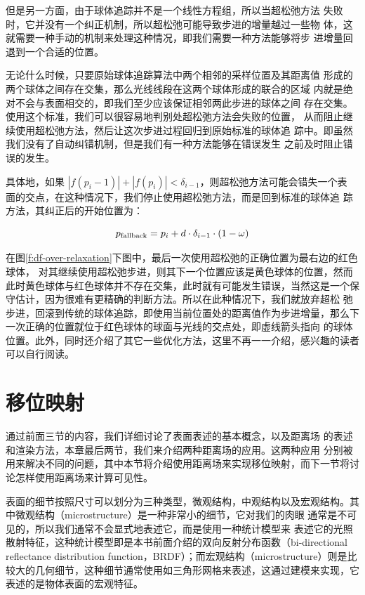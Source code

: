 但是另一方面，由于球体追踪并不是一个线性方程组，所以当超松弛方法 失败时，它并没有一个纠正机制，所以超松弛可能导致步进的增量越过一些物 体，这就需要一种手动的机制来处理这种情况，即我们需要一种方法能够将步 进增量回退到一个合适的位置。

无论什么时候，只要原始球体追踪算法中两个相邻的采样位置及其距离值 形成的两个球体之间存在交集，那么光线线段在这两个球体形成的联合的区域 内就是绝对不会与表面相交的，即我们至少应该保证相邻两此步进的球体之间 存在交集。使用这个标准，我们可以很容易地判别处超松弛方法会失败的位置， 从而阻止继续使用超松弛方法，然后让这次步进过程回归到原始标准的球体追 踪中。即虽然我们没有了自动纠错机制，但是我们有一种方法能够在错误发生 之前及时阻止错误的发生。

具体地，如果 $|f(p_i−1)| + |f(p_i)|< \delta_{i−1}$，则超松弛方法可能会错失一个表 面的交点，在这种情况下，我们停止使用超松弛方法，而是回到标准的球体追 踪方法，其纠正后的开始位置为：

\begin{equation}
	p_{\rm fallback}=p_i+d\cdot \delta_{i-1}\cdot (1-\omega)
\end{equation}

在图\ref{f:df-over-relaxation}下图中，最后一次使用超松弛的正确位置为最右边的红色球体， 对其继续使用超松弛步进，则其下一个位置应该是黄色球体的位置，然而此时黄色球体与红色球体并不存在交集，此时就有可能发生错误，当然这是一个保守估计，因为很难有更精确的判断方法。所以在此种情况下，我们就放弃超松 弛步进，回滚到传统的球体追踪，即使用当前位置处的距离值作为步进增量，那么下一次正确的位置就位于红色球体的球面与光线的交点处，即虚线箭头指向 的球体位置。此外，\cite{a:Enhanced-Sphere-Tracing}同时还介绍了其它一些优化方法，这里不再一一介绍，感兴趣的读者可以自行阅读。




\section{移位映射}
通过前面三节的内容，我们详细讨论了表面表述的基本概念，以及距离场 的表述和渲染方法，本章最后两节，我们来介绍两种距离场的应用。这两种应用 分别被用来解决不同的问题，其中本节将介绍使用距离场来实现移位映射，而下一节将讨论怎样使用距离场来计算可见性。

表面的细节按照尺寸可以划分为三种类型，微观结构，中观结构以及宏观结构。其中微观结构（microstructure）是一种非常小的细节，它对我们的肉眼 通常是不可见的，所以我们通常不会显式地表述它，而是使用一种统计模型来 表述它的光照散射特征，这种统计模型即是本书前面介绍的双向反射分布函数（bi-directional reflectance distribution function，BRDF）；而宏观结构（microstructure）则是比较大的几何细节，这种细节通常使用如三角形网格来表述，这通过建模来实现，它表述的是物体表面的宏观特征。

